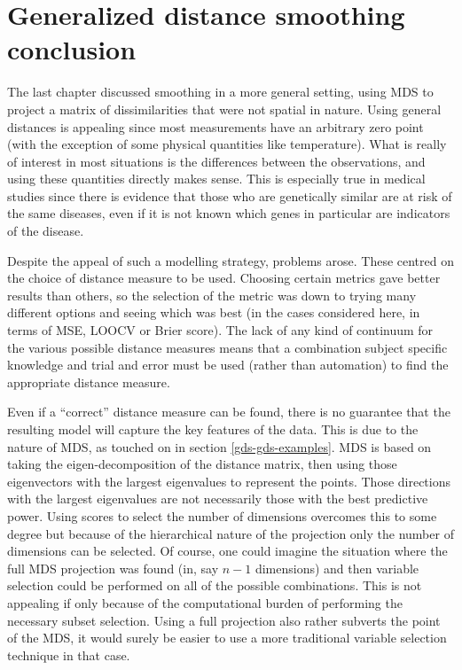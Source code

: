 \section{Generalized distance smoothing conclusion}
\label{fasend-gds-conc}

The last chapter discussed smoothing in a more general setting, using MDS to project a matrix of dissimilarities that were not spatial in nature. Using general distances is appealing since most measurements have an arbitrary zero point (with the exception of some physical quantities like temperature). What is really of interest in most situations is the differences between the observations, and using these quantities directly makes sense. This is especially true in medical studies since there is evidence that those who are genetically similar are at risk of the same diseases, even if it is not known which genes in particular are indicators of the disease.

Despite the appeal of such a modelling strategy, problems arose. These centred on the choice of distance measure to be used. Choosing certain metrics gave better results than others, so the selection of the metric was down to trying many different options and seeing which was best (in the cases considered here, in terms of MSE, LOOCV or Brier score). The lack of any kind of continuum for the various possible distance measures means that a combination subject specific knowledge and trial and error must be used (rather than automation) to find the appropriate distance measure.

Even if a ``correct'' distance measure can be found, there is no guarantee that the resulting model will capture the key features of the data. This is due to the nature of MDS, as touched on in section \ref{gds-gds-examples}. MDS is based on taking the eigen-decomposition of the distance matrix, then using those eigenvectors with the largest eigenvalues to represent the points. Those directions with the largest eigenvalues are not necessarily those with the best predictive power. Using scores to select the number of dimensions overcomes this to some degree but because of the hierarchical nature of the projection only the number of dimensions can be selected. Of course, one could imagine the situation where the full MDS projection was found (in, say $n-1$ dimensions) and then variable selection could be performed on all of the possible combinations. This is not appealing if only because of the computational burden of performing the necessary subset selection. Using a full projection also rather subverts the point of the MDS, it would surely be easier to use a more traditional variable selection technique in that case.

